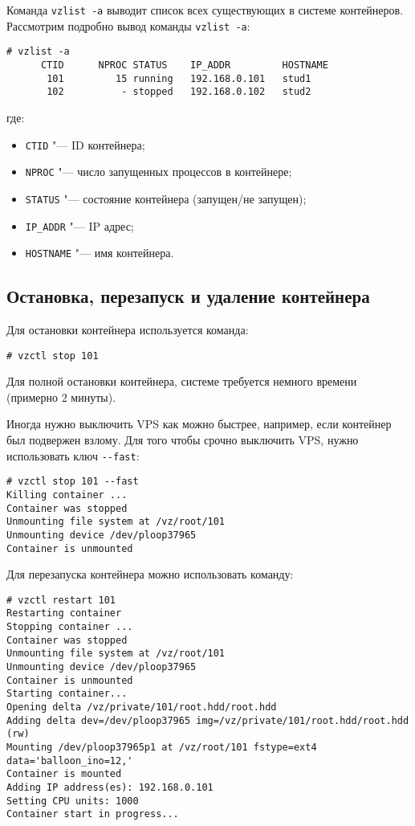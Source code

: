 Команда \texttt{vzlist -a} выводит список всех существующих в системе контейнеров.
Рассмотрим подробно вывод команды \texttt{vzlist -a}:
\begin{lstlisting}
# vzlist -a
      CTID      NPROC STATUS    IP_ADDR         HOSTNAME
       101         15 running   192.168.0.101   stud1
       102          - stopped   192.168.0.102   stud2
\end{lstlisting}
где:
\begin{itemize}
    \item \texttt{CTID} "--- ID контейнера;
    \item \texttt{NPROC} "--- число запущенных процессов в контейнере;
    \item \texttt{STATUS} "--- состояние контейнера (запущен/не запущен);
    \item \texttt{IP\_ADDR} "--- IP адрес;
    \item \texttt{HOSTNAME} "--- имя контейнера.
\end{itemize}

\subsection{Остановка, перезапуск и удаление контейнера}
Для остановки контейнера используется команда:
\begin{lstlisting}
# vzctl stop 101
\end{lstlisting}

Для полной остановки контейнера, системе требуется немного времени (примерно 2 минуты).

Иногда нужно выключить VPS как можно быстрее, например, если контейнер был подвержен взлому.
Для того чтобы срочно выключить VPS, нужно использовать ключ \texttt{-{}-fast}:
\begin{lstlisting}
# vzctl stop 101 --fast
Killing container ...
Container was stopped
Unmounting file system at /vz/root/101
Unmounting device /dev/ploop37965
Container is unmounted
\end{lstlisting}

Для перезапуска контейнера можно использовать команду:
\begin{lstlisting}
# vzctl restart 101
Restarting container
Stopping container ...
Container was stopped
Unmounting file system at /vz/root/101
Unmounting device /dev/ploop37965
Container is unmounted
Starting container...
Opening delta /vz/private/101/root.hdd/root.hdd
Adding delta dev=/dev/ploop37965 img=/vz/private/101/root.hdd/root.hdd (rw)
Mounting /dev/ploop37965p1 at /vz/root/101 fstype=ext4 data='balloon_ino=12,' 
Container is mounted
Adding IP address(es): 192.168.0.101
Setting CPU units: 1000
Container start in progress...
\end{lstlisting}

